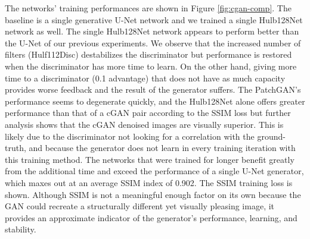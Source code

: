 The networks' training performances are shown in Figure \ref{fig:cgan-comp}. The baseline is a single generative U-Net network and we trained a single Hulb128Net network as well. The single Hulb128Net network appears to perform better than the U-Net of our previous experiments. We observe that the increased number of filters (Hulf112Disc) destabilizes the discriminator but performance is restored when the discriminator has more time to learn. On the other hand, giving more time to a discriminator (0.1 advantage) that does not have as much capacity provides worse feedback and the result of the generator suffers. The PatchGAN's performance seems to degenerate quickly, and the Hulb128Net alone offers greater performance than that of a \acs{cGAN} pair according to the \ac{SSIM} loss but further analysis shows that the \acs{cGAN} denoised images are visually superior. This is likely due to the discriminator not looking for a correlation with the ground-truth, and because the generator does not learn in every training iteration with this training method. The networks that were trained for longer benefit greatly from the additional time and exceed the performance of a single U-Net generator, which maxes out at an average \acs{SSIM} index of 0.902. The \acs{SSIM} training loss is shown. Although \acs{SSIM} is not a meaningful enough factor on its own because the \ac{GAN} could recreate a structurally different yet visually pleasing image, it provides an approximate indicator of the generator's performance, learning, and stability.

